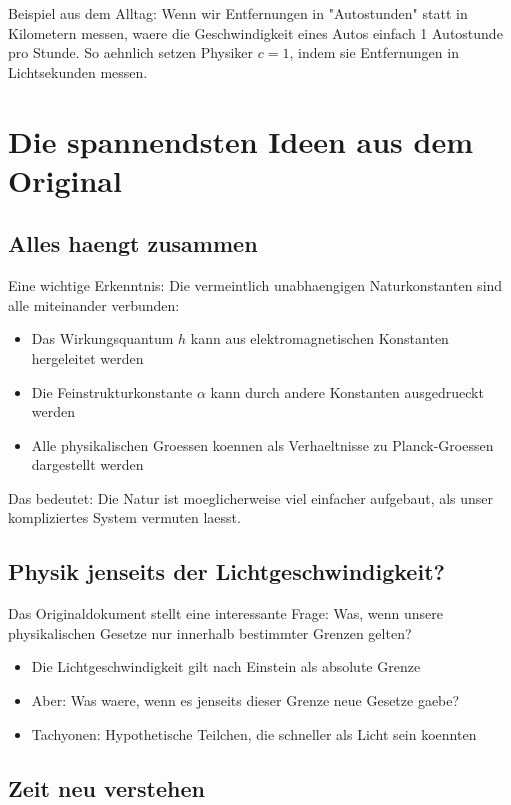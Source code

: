 \documentclass{article}
\begin{document}
	Beispiel aus dem Alltag: Wenn wir Entfernungen in "Autostunden" statt in Kilometern messen, waere die Geschwindigkeit eines Autos einfach 1 Autostunde pro Stunde. So aehnlich setzen Physiker $c = 1$, indem sie Entfernungen in Lichtsekunden messen.
	
	\section{Die spannendsten Ideen aus dem Original}
	
	\subsection{Alles haengt zusammen}
	
	Eine wichtige Erkenntnis: Die vermeintlich unabhaengigen Naturkonstanten sind alle miteinander verbunden:
	
	\begin{itemize}
		\item Das Wirkungsquantum $h$ kann aus elektromagnetischen Konstanten hergeleitet werden
		\item Die Feinstrukturkonstante $\alpha$ kann durch andere Konstanten ausgedrueckt werden
		\item Alle physikalischen Groessen koennen als Verhaeltnisse zu Planck-Groessen dargestellt werden
	\end{itemize}
	
	Das bedeutet: Die Natur ist moeglicherweise viel einfacher aufgebaut, als unser kompliziertes System vermuten laesst.
	
	\subsection{Physik jenseits der Lichtgeschwindigkeit?}
	
	Das Originaldokument stellt eine interessante Frage: Was, wenn unsere physikalischen Gesetze nur innerhalb bestimmter Grenzen gelten?
	
	\begin{itemize}
		\item Die Lichtgeschwindigkeit gilt nach Einstein als absolute Grenze
		\item Aber: Was waere, wenn es jenseits dieser Grenze neue Gesetze gaebe?
		\item Tachyonen: Hypothetische Teilchen, die schneller als Licht sein koennten
	\end{itemize}
	
	\subsection{Zeit neu verstehen}
	
\end{document}
